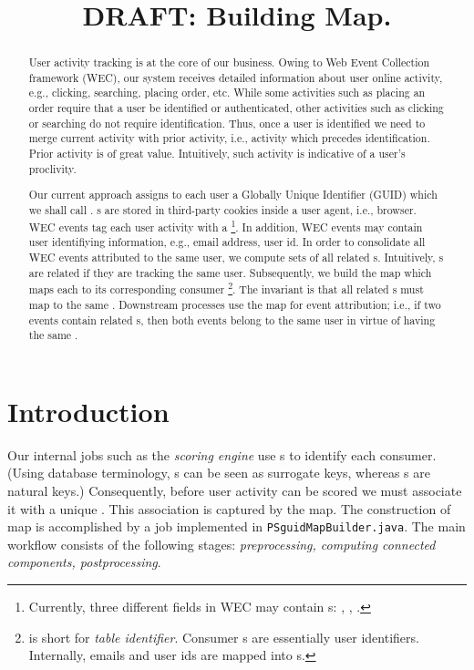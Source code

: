 \documentclass{article}[12pt]
\title{DRAFT: Building {\PSGUID} Map.}
\numberwithin{figure}{section}
\begin{document}
\maketitle


\begin{abstract}
User activity tracking is at the core of our business.  Owing to Web Event Collection framework (WEC), our system
receives detailed information about user online activity, e.g., clicking, searching, placing order, etc.  
While some activities such as placing an order require that a user be identified or authenticated, other activities such as clicking or searching
do not require identification. 
Thus, once a user is identified we need to merge current activity with prior activity, i.e., activity which precedes
identification.  Prior activity is of great value.  Intuitively, such activity is indicative of a user's proclivity.

Our current approach assigns to each user a Globally Unique Identifier (GUID) which we shall call {\PSGUID}.  {\PSGUID}s are stored in third-party cookies
inside a user agent, i.e., browser.  WEC events tag each user activity with a {\PSGUID}\footnote{Currently, three different fields in WEC
may contain {\PSGUID}s: {\PSRW}, {\PSRJ}, {\PSGUID}.}.
In addition, WEC events may contain user identifiying information, e.g., email address, user id.  In order to consolidate all WEC events attributed to the same user, we compute sets of all related {\PSGUID}s.
Intuitively, {\PSGUID}s are related if they are tracking the same user.
Subsequently, we build the map {\PSGUIDMAP} which maps each {\PSGUID} to its corresponding consumer {\TID}\footnote{{\TID} is short
for \emph{table identifier}.  Consumer {\TID}s are essentially user identifiers.  Internally, emails and user ids are mapped into {\TID}s.}.
The invariant is that all related {\PSGUID}s must map to the same {\TID}.
Downstream processes use the map for event attribution; i.e., if two events contain related {\PSGUID}s, then both events belong to the same user
in virtue of having the same {\TID}.

\end{abstract}

\section{Introduction}

Our internal jobs such as the \emph{scoring engine}
use {\TID}s to identify each consumer.  (Using database terminology, {\PSGUID}s can be seen as surrogate keys, whereas {\TID}s are natural keys.)
Consequently, before user activity can be scored we must associate it with a unique {\TID}.  This association is captured by the {\PSGUID} map.
The construction of {\PSGUID} map is accomplished by a {\MAPREDUCE} job implemented in \texttt{PSguidMapBuilder.java}.
The main workflow consists of the following stages: \emph{preprocessing, computing connected components, postprocessing}.
\end{document}
